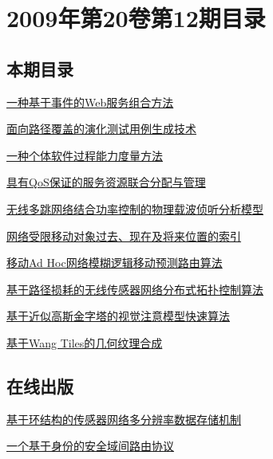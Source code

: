 \documentclass[a4paper]{article}
\begin{document}
\section{\textbf{2009年第20卷第12期目录}}
\subsection{本期目录}
\href{http://www.jos.org.cn/ch/reader/download_pdf.aspx?file_no=3433&year_id=2009&quarter_id=12&falg=1}{一种基于事件的Web服务组合方法}

\href{http://www.jos.org.cn/ch/reader/download_pdf.aspx?file_no=580&year_id=2009&quarter_id=12&falg=1}{面向路径覆盖的演化测试用例生成技术}

\href{http://www.jos.org.cn/ch/reader/download_pdf.aspx?file_no=582&year_id=2009&quarter_id=12&falg=1}{一种个体软件过程能力度量方法}

\href{http://www.jos.org.cn/ch/reader/download_pdf.aspx?file_no=3419&year_id=2009&quarter_id=12&falg=1}{具有QoS保证的服务资源联合分配与管理}

\href{http://www.jos.org.cn/ch/reader/download_pdf.aspx?file_no=3401&year_id=2009&quarter_id=12&falg=1}{无线多跳网络结合功率控制的物理载波侦听分析模型}

\href{http://www.jos.org.cn/ch/reader/download_pdf.aspx?file_no=3400&year_id=2009&quarter_id=12&falg=1}{网络受限移动对象过去、现在及将来位置的索引}

\href{http://www.jos.org.cn/ch/reader/download_pdf.aspx?file_no=3411&year_id=2009&quarter_id=12&falg=1}{移动Ad Hoc网络模糊逻辑移动预测路由算法}

\href{http://www.jos.org.cn/ch/reader/download_pdf.aspx?file_no=3414&year_id=2009&quarter_id=12&falg=1}{基于路径损耗的无线传感器网络分布式拓扑控制算法}

\href{http://www.jos.org.cn/ch/reader/download_pdf.aspx?file_no=3649&year_id=2009&quarter_id=12&falg=1}{基于近似高斯金字塔的视觉注意模型快速算法}

\href{http://www.jos.org.cn/ch/reader/download_pdf.aspx?file_no=3529&year_id=2009&quarter_id=12&falg=1}{基于Wang Tiles的几何纹理合成}

\subsection{在线出版}
\href{http://www.jos.org.cn/ch/reader/download_pdf.aspx?file_no=3474&year_id=2009&quarter_id=12&falg=1}{基于环结构的传感器网络多分辨率数据存储机制}

\href{http://www.jos.org.cn/ch/reader/download_pdf.aspx?file_no=3396&year_id=2009&quarter_id=12&falg=1}{一个基于身份的安全域间路由协议}
\end{document}
